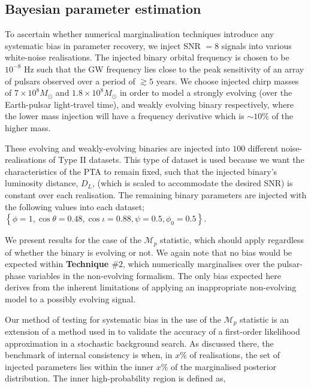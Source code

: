 \documentclass[prd,showpacs,nofootinbib]{revtex4}
\begin{document}
\subsection{Bayesian parameter estimation}

To ascertain whether numerical marginalisation techniques introduce any systematic bias in parameter recovery, we inject SNR $=8$ signals into various white-noise realisations. The injected binary orbital frequency is chosen to be $10^{-8}$ Hz such that the GW frequency lies close to the peak sensitivity of an array of pulsars observed over a period of $\gtrsim 5$ years. We choose injected chirp masses of $7\times 10^8M_{\odot}$ and $1.8\times 10^8M_{\odot}$ in order to model a strongly evolving (over the Earth-pulsar light-travel time), and weakly evolving binary respectively, where the lower mass injection will have a frequency derivative which is $\sim 10\%$ of the higher mass.

These evolving and weakly-evolving binaries are injected into $100$ different noise-realisations of Type II datasets. This type of dataset is used because we want the characteristics of the PTA to remain fixed, such that the injected binary's luminosity distance, $D_L$, (which is scaled to accommodate the desired SNR) is constant over each realisation. The remaining binary parameters are injected with the following values into each dataset; $\left\{\phi=1,\cos\theta=0.48,\cos\iota=0.88,\psi=0.5,\phi_0=0.5\right\}$. %

We present results for the case of the {\bf $\mathcal{M}_p$} statistic, which should apply regardless of whether the binary is evolving or not. We again note that no bias would be expected within {\bf Technique $\#2$}, which numerically marginalises over the pulsar-phase variables in the non-evolving formalism. The only bias expected here derives from the inherent limitations of applying an inappropriate non-evolving model to a possibly evolving signal. 


Our method of testing for systematic bias in the use of the {\bf $\mathcal{M}_p$} statistic is an extension of a method used in \citet{ellis-first-order} to validate the accuracy of a first-order likelihood approximation in a stochastic background search. As discussed there, the benchmark of internal consistency is when, in $x\%$ of realisations, the set of injected parameters lies within the inner $x\%$ of the marginalised posterior distribution. The inner high-probability region is defined as,
\end{document}
